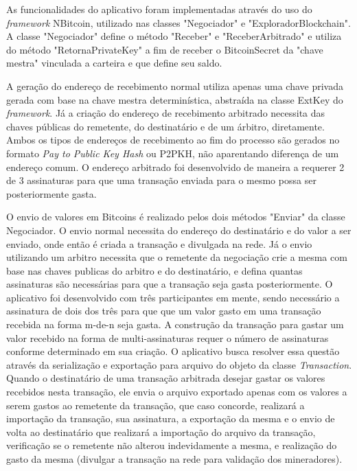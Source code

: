 \documentclass[
	article,			%
	11pt,				%
	oneside,			%
	a4paper,			%
	chapter=TITLE,		%
	section=TITLE,		%
	subsection=TITLE,	%
	subsubsection=TITLE, %
	english,			%
	brazil,				%
	sumario=tradicional
	]{ifrs-artigo-abntex2}
\begin{document}

As funcionalidades do aplicativo foram implementadas através do uso do \textit{framework} NBitcoin, utilizado nas classes "Negociador" e "ExploradorBlockchain". A classe "Negociador" define o método "Receber" e "ReceberArbitrado" e utiliza do método "RetornaPrivateKey" a fim de receber o BitcoinSecret da "chave mestra" vinculada a carteira e que define seu saldo.


A geração do endereço de recebimento normal utiliza apenas uma chave privada gerada com base na chave mestra determinística, abstraída na classe ExtKey do \textit{framework}. Já a criação do endereço de recebimento arbitrado necessita das chaves públicas do remetente, do destinatário e de um árbitro, diretamente. Ambos os tipos de endereços de recebimento ao fim do processo são gerados no formato \textit{Pay to Public Key Hash} ou P2PKH, não aparentando diferença de um endereço comum. O endereço arbitrado foi desenvolvido de maneira a requerer 2 de 3 assinaturas para que uma transação enviada para o mesmo possa ser posteriormente gasta.


O envio de valores em Bitcoins é realizado pelos dois métodos "Enviar" da classe Negociador. O envio normal necessita do endereço do destinatário e do valor a ser enviado, onde então é criada a transação e divulgada na rede. 
Já o envio utilizando um arbitro necessita que o remetente da negociação crie a mesma com base nas chaves publicas do arbitro e do destinatário, e defina quantas assinaturas são necessárias para que a transação seja gasta posteriormente. O aplicativo foi desenvolvido com três participantes em mente, sendo necessário a assinatura de dois dos três para que que um valor gasto em uma transação recebida na forma m-de-n seja gasta. A construção da transação para gastar um valor recebido na forma de multi-assinaturas requer o número de assinaturas conforme determinado em sua criação. O aplicativo busca resolver essa questão através da serialização e exportação para arquivo do objeto da classe \textit{Transaction}. 
Quando o destinatário de uma transação arbitrada desejar gastar os valores recebidos nesta transação, ele envia o arquivo exportado apenas com os valores a serem gastos ao remetente da transação, que caso concorde, realizará a importação da transação, sua assinatura, a exportação da mesma e o envio de volta ao destinatário que realizará a importação do arquivo da transação, verificação se o remetente não alterou indevidamente a mesma, e realização do gasto da mesma (divulgar a transação na rede para validação dos mineradores).
\end{document}
